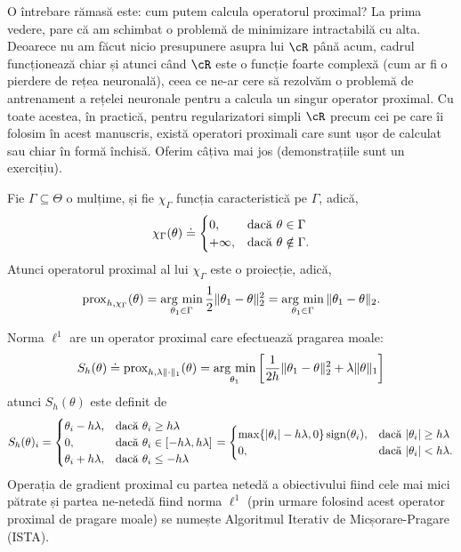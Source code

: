 \documentclass[../../book-main_ro.tex]{subfiles}
\begin{document}
O întrebare rămasă este: cum putem calcula operatorul proximal? La prima vedere, pare că am schimbat o problemă de minimizare intractabilă cu alta. Deoarece nu am făcut nicio presupunere asupra lui \(\cR\) până acum, cadrul funcționează chiar și atunci când \(\cR\) este o funcție foarte complexă (cum ar fi o pierdere de rețea neuronală), ceea ce ne-ar cere să rezolvăm o problemă de antrenament a rețelei neuronale pentru a calcula un singur operator proximal. Cu toate acestea, în practică, pentru regularizatori simpli \(\cR\) precum cei pe care îi folosim în acest manuscris, există operatori proximali care sunt ușor de calculat sau chiar în formă închisă. Oferim câțiva mai jos (demonstrațiile sunt un exercițiu).

\begin{example}\label{example:prox-of-characteristic-function}
    Fie \(\Gamma \subseteq \Theta\) o mulțime, și fie \(\chi_{\Gamma}\) funcția caracteristică pe \(\Gamma\), adică,
    \begin{equation}
        \chi_{\Gamma}(\theta) \doteq \begin{cases}0, & \text{dacă}\ \theta \in \Gamma \\ +\infty, & \text{dacă}\ \theta \notin \Gamma.\end{cases}
    \end{equation}
    Atunci operatorul proximal al lui \(\chi_{\Gamma}\) este o proiecție, adică,
    \begin{equation}
        \prox_{h, \chi_{\Gamma}}(\theta) = \argmin_{\theta_{1} \in \Gamma}\frac{1}{2}\norm{\theta_{1} - \theta}_{2}^{2} = \argmin_{\theta_{1} \in \Gamma}\norm{\theta_{1} - \theta}_{2}.
    \end{equation}
\end{example}

\begin{example}\label{example:prox-of-l1}
    Norma \(\ell^{1}\) are un operator proximal care efectuează pragarea moale:
    \begin{equation}
        S_{h}(\theta) \doteq \prox_{h, \lambda \norm{\cdot}_{1}}(\theta) = \argmin_{\theta_{1}}\bs{\frac{1}{2h}\norm{\theta_{1} - \theta}_{2}^{2} + \lambda\norm{\theta}_{1}}
    \end{equation}
    atunci \(S_{h}(\theta)\) este definit de
    \begin{equation}
        S_{h}(\theta)_{i} = \casework{\theta_{i} - h\lambda, & \text{dacă}\ \theta_{i} \geq h\lambda \\ 0, & \text{dacă}\ \theta_{i} \in [-h\lambda, h\lambda] \\ \theta_{i} + h\lambda, & \text{dacă}\ \theta_{i} \leq -h\lambda} = \casework{\max\{\abs{\theta_{i}} - h\lambda, 0\}\sign(\theta_{i}), & \text{dacă}\ \abs{\theta_{i}} \geq h\lambda \\ 0, & \text{dacă}\ \abs{\theta_{i}} < h\lambda.}
    \end{equation}
    Operația de gradient proximal cu partea netedă a obiectivului fiind cele mai mici pătrate și partea ne-netedă fiind norma \(\ell^{1}\) (prin urmare folosind acest operator proximal de pragare moale) se numește Algoritmul Iterativ de Micșorare-Pragare (ISTA).
\end{example}
\end{document}
